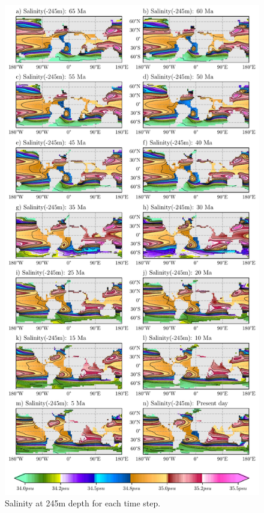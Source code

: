 \documentclass[a4paper]{article}
\begin{document}
\begin{multicols}{2}



\end{multicols}
\begin{figure}[H]
	\centering
	\includegraphics[width=0.7\linewidth]{full_sss.pdf}
	\caption{Salinity at 245m depth for each time step.}
	\label{fig:sss_total}
\end{figure}
\end{document}
